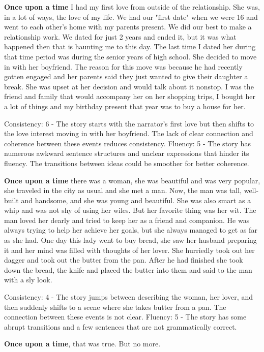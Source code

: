 \documentclass{article}
\begin{document}
\textbf{Once upon a time} I had my first love from outside of the relationship. She was, in a lot of ways, the love of my life. We had our "first date" when we were 16 and went to each other's home with my parents present. We did our best to make a relationship work. We dated for just 2 years and ended it, but it was what happened then that is haunting me to this day. The last time I dated her during that time period was during the senior years of high school. She decided to move in with her boyfriend. The reason for this move was because he had recently gotten engaged and her parents said they just wanted to give their daughter a break. She was upset at her decision and would talk about it nonstop. I was the friend and family that would accompany her on her shopping trips, I bought her a lot of things and my birthday present that year was to buy a house for her.

Consistency: 6 - The story starts with the narrator's first love but then shifts to the love interest moving in with her boyfriend. The lack of clear connection and coherence between these events reduces consistency.
Fluency: 5 - The story has numerous awkward sentence structures and unclear expressions that hinder its fluency. The transitions between ideas could be smoother for better coherence.

\textbf{Once upon a time} there was a woman, she was beautiful and was very popular, she traveled in the city as usual and she met a man. Now, the man was tall, well-built and handsome, and she was young and beautiful. She was also smart as a whip and was not shy of using her wiles. But her favorite thing was her wit. The man loved her dearly and tried to keep her as a friend and companion. He was always trying to help her achieve her goals, but she always managed to get as far as she had. One day this lady went to buy bread, she saw her husband preparing it and her mind was filled with thoughts of her lover. She hurriedly took out her dagger and took out the butter from the pan. After he had finished she took down the bread, the knife and placed the butter into them and said to the man with a sly look.

Consistency: 4 - The story jumps between describing the woman, her lover, and then suddenly shifts to a scene where she takes butter from a pan. The connection between these events is not clear.
Fluency: 5 - The story has some abrupt transitions and a few sentences that are not grammatically correct.

\textbf{Once upon a time}, that was true. But no more.
\end{document}
